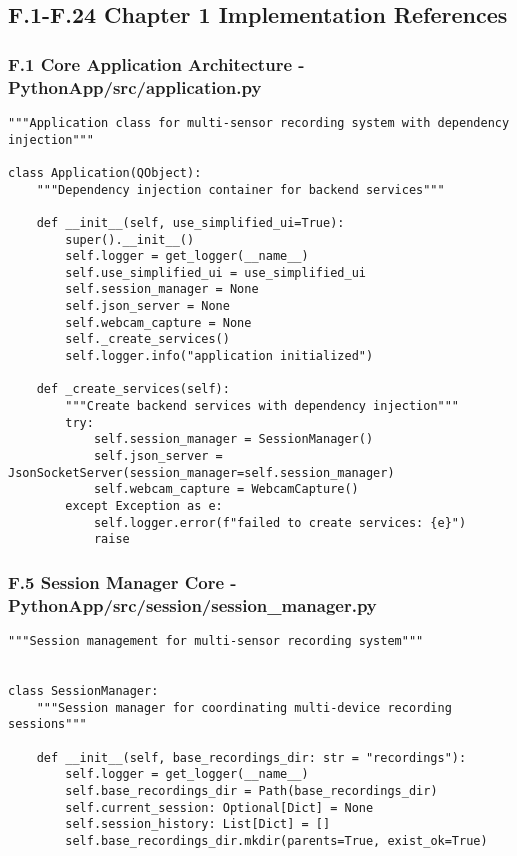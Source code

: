 \documentclass[12pt,a4paper]{report}
\begin{document}
{{\subsection{F.1-F.24 Chapter 1 Implementation References}

\subsubsection{F.1 Core Application Architecture - PythonApp/src/application.py}

\begin{verbatim}
"""Application class for multi-sensor recording system with dependency injection"""

class Application(QObject):
    """Dependency injection container for backend services"""
    
    def __init__(self, use_simplified_ui=True):
        super().__init__()
        self.logger = get_logger(__name__)
        self.use_simplified_ui = use_simplified_ui
        self.session_manager = None
        self.json_server = None
        self.webcam_capture = None
        self._create_services()
        self.logger.info("application initialized")
    
    def _create_services(self):
        """Create backend services with dependency injection"""
        try:
            self.session_manager = SessionManager()
            self.json_server = JsonSocketServer(session_manager=self.session_manager)
            self.webcam_capture = WebcamCapture()
        except Exception as e:
            self.logger.error(f"failed to create services: {e}")
            raise
\end{verbatim}

\subsubsection{F.5 Session Manager Core - PythonApp/src/session/session_manager.py}

\begin{verbatim}
"""Session management for multi-sensor recording system"""


class SessionManager:
    """Session manager for coordinating multi-device recording sessions"""

    def __init__(self, base_recordings_dir: str = "recordings"):
        self.logger = get_logger(__name__)
        self.base_recordings_dir = Path(base_recordings_dir)
        self.current_session: Optional[Dict] = None
        self.session_history: List[Dict] = []
        self.base_recordings_dir.mkdir(parents=True, exist_ok=True)


\end{verbatim}}}
\end{document}
